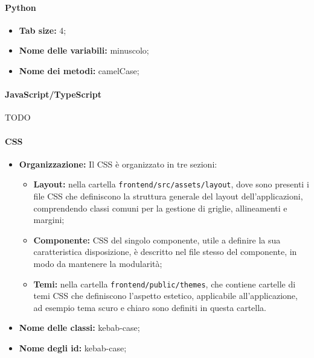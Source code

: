\paragraph{Python}
\begin{itemize}
  \item \textbf{Tab size:} 4;
  \item \textbf{Nome delle variabili:} minuscolo;
  \item \textbf{Nome dei metodi:} camelCase;
\end{itemize}

\paragraph{JavaScript/TypeScript}
TODO

\paragraph{CSS}

\begin{itemize}
  \item \textbf{Organizzazione:} Il CSS è organizzato in tre sezioni:
  \begin{itemize}
    \item \textbf{Layout:} nella cartella \texttt{frontend/src/assets/layout}, dove sono presenti i file CSS che definiscono la struttura generale del layout dell'applicazioni, comprendendo classi comuni per la gestione di griglie, allineamenti e margini;
    \item \textbf{Componente:} CSS del singolo componente, utile a definire la sua caratteristica disposizione, è descritto nel file stesso del componente, in modo da mantenere la modularità;
    \item \textbf{Temi:} nella cartella \texttt{frontend/public/themes}, che contiene cartelle di temi CSS che definiscono l'aspetto estetico, applicabile all'applicazione, ad esempio tema scuro e chiaro sono definiti in questa cartella.
  \end{itemize}
  \item \textbf{Nome delle classi:} kebab-case;
  \item \textbf{Nome degli id:} kebab-case;
\end{itemize}